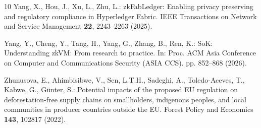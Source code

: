 \documentclass[runningheads]{llncs}
\begin{document}
\begin{thebibliography}{10}
Yang, X., Hou, J., Xu, L., Zhu, L.: {zkFabLedger}: Enabling privacy preserving
  and regulatory compliance in {Hyperledger Fabric}. IEEE Transactions on
  Network and Service Management  \textbf{22},  2243--2263 (2025).

Yang, Y., Cheng, Y., Tang, H., Yang, G., Zhang, B., Ren, K.: {SoK}:
  Understanding {zkVM}: From research to practice. In: Proc. ACM Asia
  Conference on Computer and Communications Security (ASIA CCS). pp. 852--868
  (2026). 

Zhunusova, E., Ahimbisibwe, V., Sen, L.T.H., Sadeghi, A., Toledo-Aceves, T.,
  Kabwe, G., G{\"u}nter, S.: Potential impacts of the proposed {EU} regulation
  on deforestation-free supply chains on smallholders, indigenous peoples, and
  local communities in producer countries outside the {EU}. Forest Policy and
  Economics  \textbf{143},  102817 (2022). 

\end{thebibliography}
\end{document}

